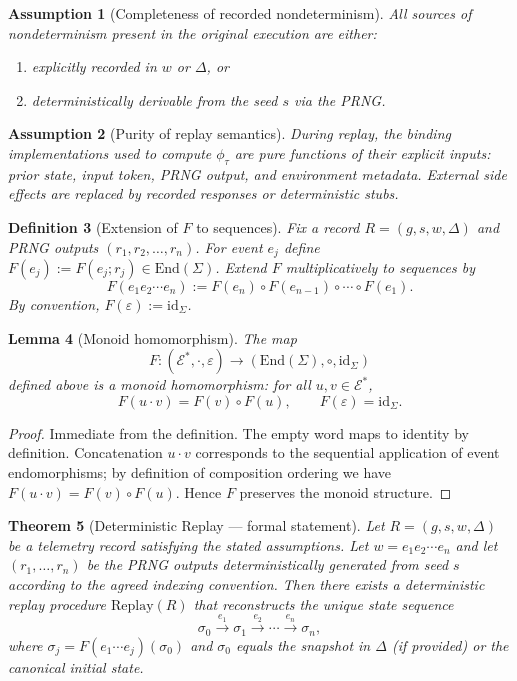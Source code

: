 \documentclass[11pt]{article}
\newtheorem{definition}{Definition}[section]
\newtheorem{lemma}[definition]{Lemma}
\newtheorem{theorem}[definition]{Theorem}
\newtheorem{assumption}[definition]{Assumption}
\begin{document}
\begin{assumption}[Completeness of recorded nondeterminism]
All sources of nondeterminism present in the original execution are either:
\begin{enumerate}
  \item explicitly recorded in $w$ or $\Delta$, or
  \item deterministically derivable from the seed $s$ via the PRNG.
\end{enumerate}
\end{assumption}

\begin{assumption}[Purity of replay semantics]
During replay, the binding implementations used to compute $\phi_\tau$ are pure functions of their explicit inputs: prior state, input token, PRNG output, and environment metadata. External side effects are replaced by recorded responses or deterministic stubs.
\end{assumption}

\begin{definition}[Extension of $F$ to sequences]
Fix a record $R=(g,s,w,\Delta)$ and PRNG outputs $(r_1,r_2,\dots,r_n)$. For event $e_j$ define $F(e_j):=F(e_j;r_j)\in\mathrm{End}(\Sigma)$. Extend $F$ multiplicatively to sequences by
\[
F(e_1 e_2 \cdots e_n) := F(e_n)\circ F(e_{n-1})\circ \cdots \circ F(e_1).
\]
By convention, $F(\varepsilon):=\mathrm{id}_\Sigma$.
\end{definition}

\begin{lemma}[Monoid homomorphism]
The map
\[
F : (\mathcal{E}^*,\cdot,\varepsilon) \longrightarrow (\mathrm{End}(\Sigma),\circ,\mathrm{id}_\Sigma)
\]
defined above is a monoid homomorphism: for all $u,v\in\mathcal{E}^*$,
\[
F(u\cdot v) = F(v)\circ F(u),
\qquad F(\varepsilon)=\mathrm{id}_\Sigma.
\]
\end{lemma}

\begin{proof}
Immediate from the definition. The empty word maps to identity by definition. Concatenation $u\cdot v$ corresponds to the sequential application of event endomorphisms; by definition of composition ordering we have $F(u\cdot v)=F(v)\circ F(u)$. Hence $F$ preserves the monoid structure.
\end{proof}

\begin{theorem}[Deterministic Replay --- formal statement]
Let $R=(g,s,w,\Delta)$ be a telemetry record satisfying the stated assumptions. Let $w=e_1 e_2 \cdots e_n$ and let $(r_1,\dots,r_n)$ be the PRNG outputs deterministically generated from seed $s$ according to the agreed indexing convention. Then there exists a deterministic replay procedure $\mathrm{Replay}(R)$ that reconstructs the unique state sequence
\[
\sigma_0 \xrightarrow{e_1} \sigma_1 \xrightarrow{e_2} \cdots \xrightarrow{e_n} \sigma_n,
\]
where $\sigma_j = F(e_1\cdots e_j)(\sigma_0)$ and $\sigma_0$ equals the snapshot in $\Delta$ (if provided) or the canonical initial state.
\end{theorem}
\end{document}
